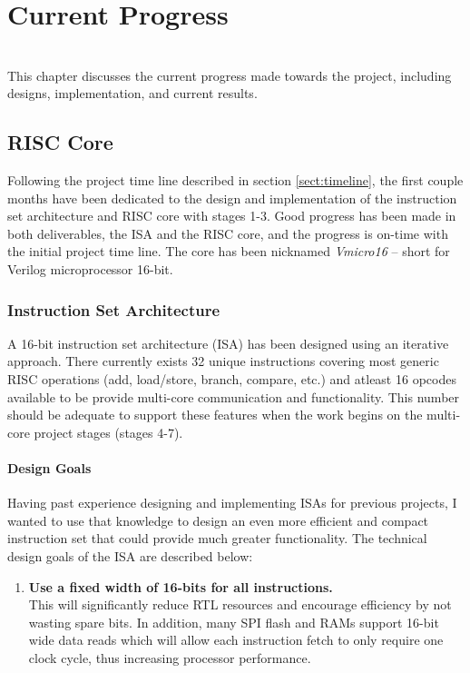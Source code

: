\documentclass[11pt,a4paper]{report}
\begin{document}
{\chapter{Current Progress}
{%
\startcontents[chapters]
}
\noindent\\
This chapter discusses the current progress made towards the project, including designs, implementation, and current results.

\section{RISC Core}
Following the project time line described in section \ref{sect:timeline}, the first couple months have been dedicated to the design and implementation of the instruction set architecture and RISC core with stages 1-3. Good progress has been made in both deliverables, the ISA and the RISC core, and the progress is on-time with the initial project time line. The core has been nicknamed \textit{Vmicro16} -- short for Verilog microprocessor 16-bit.

\subsection{Instruction Set Architecture}
A 16-bit instruction set architecture (ISA) has been designed using an iterative approach. There currently exists 32 unique instructions covering most generic RISC operations (add, load/store, branch, compare, etc.) and atleast 16 opcodes available to be provide multi-core communication and functionality. This number should be adequate to support these features when the work begins on the multi-core project stages (stages 4-7).

\subsubsection{Design Goals}
Having past experience designing and implementing ISAs for previous projects, I wanted to use that knowledge to design an even more efficient and compact instruction set that could provide much greater functionality. The technical design goals of the ISA are described below:

\begin{enumerate}[leftmargin=3\parindent, label=\bfseries ISA\arabic*, style=nextline]
\item{\textbf{Use a fixed width of 16-bits for all instructions.}\\
This will significantly reduce RTL resources and encourage efficiency by not wasting spare bits. In addition, many SPI flash and RAMs support 16-bit wide data reads which will allow each instruction fetch to only require one clock cycle, thus increasing processor performance.}\label{isa:16}


\end{enumerate}}
\end{document}
